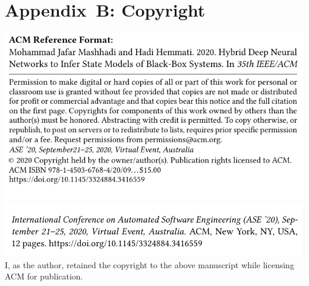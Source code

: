 \chapter{Appendix~B: Copyright}\label{appendixb}
\includegraphics[width=\textwidth]{Copyright.png}
\includegraphics[width=\textwidth]{Copyright2.png}
I, as the author, retained the copyright to the above manuscript while licensing ACM for publication.
